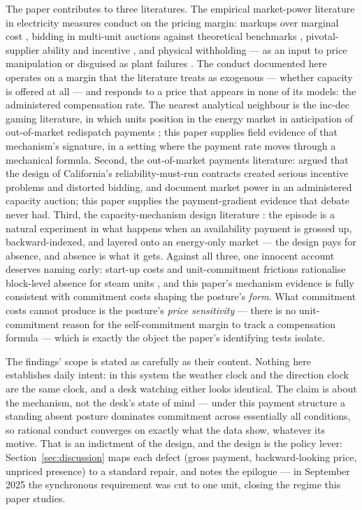 The paper contributes to three literatures. The empirical market-power
literature in electricity measures conduct on the pricing margin: markups
over marginal cost \citep{Wolfram1999_duopoly,
BorensteinBushnellWolak2002_california}, bidding in multi-unit auctions
against theoretical benchmarks \citep{vonderFehrHarbord1993_spot,
HortacsuPuller2008_ercot}, pivotal-supplier ability and incentive
\citep{Wolak2003_unilateral, McRaeWolak2014_unilateral}, and physical
withholding --- as an input to price manipulation
\citep{JoskowKahn2002_california} or disguised as plant failures
\citep{FogelbergLazarczyk2019_failures,
BerglerHeimHuschelrath2017_failures}. The conduct documented here operates
on a margin that the literature treats as exogenous --- whether capacity is
offered at all --- and responds to a price that appears in none of its
models: the administered compensation rate. The nearest analytical
neighbour is the inc-dec gaming literature, in which units position in the
energy market in anticipation of out-of-market redispatch payments
\citep{HirthSchlecht2020_incdec}; this paper supplies field evidence of
that mechanism's signature, in a setting where the payment rate moves
through a mechanical formula. Second, the out-of-market payments
literature: \citet{BushnellWolak1999_rmr} argued that the design of
California's reliability-must-run contracts created serious incentive
problems and distorted bidding, and \citet{TeirilaRitz2019_capacity}
document market power in an administered capacity auction; this paper
supplies the payment-gradient evidence that debate never had. Third, the
capacity-mechanism design literature
\citep{CramtonOckenfelsStoft2013_capacity, Fabra2018_capacity}: the episode
is a natural experiment in what happens when an availability payment is
grossed up, backward-indexed, and layered onto an energy-only market ---
the design pays for absence, and absence is what it gets. Against all
three, one innocent account deserves naming early: start-up costs and
unit-commitment frictions rationalise block-level absence for steam units
\citep{Reguant2014_complex}, and this paper's mechanism evidence is fully
consistent with commitment costs shaping the posture's \emph{form}. What
commitment costs cannot produce is the posture's \emph{price sensitivity}
--- there is no unit-commitment reason for the self-commitment margin to
track a compensation formula --- which is exactly the object the paper's
identifying tests isolate.

The findings' scope is stated as carefully as their content. Nothing here
establishes daily intent: in this system the weather clock and the direction
clock are the same clock, and a desk watching either looks identical. The
claim is about the mechanism, not the desk's state of mind --- under this
payment structure a standing absent posture dominates commitment across
essentially all conditions, so rational conduct converges on exactly what the
data show, whatever its motive. That is an indictment of the design, and the
design is the policy lever: Section~\ref{sec:discussion} maps each defect
(gross payment, backward-looking price, unpriced presence) to a standard
repair, and notes the epilogue --- in September 2025 the synchronous
requirement was cut to one unit, closing the regime this paper studies.

